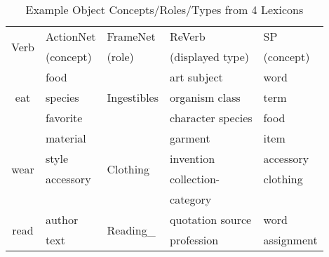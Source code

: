 \begin{table}[th]
\centering
\scriptsize
\caption{Example Object Concepts/Roles/Types from 4 Lexicons}
\label{snapshot}
\begin{tabular}{|c|l|l|l|l|}
\hline
\multirow{2}{*}{Verb} & ActionNet & FrameNet   & ReVerb & SP\\
 & (concept) & (role) & (displayed type)& (concept) \\
\hline \hline
\multirow{3}{*}{eat} & food & \multirow{3}{*}{Ingestibles} & art subject & word	\\
      &  species            &       & organism class & term\\
      &  favorite           &       & character species & food\\
      \hline
\multirow{4}{*}{wear} & material & \multirow{4}{*}{Clothing} & garment &
item\\
      & style  & & invention &  accessory\\
      &  accessory &       & collection-& 	clothing\\
      &  &       & category & \\
      \hline
\multirow{3}{*}{read} & author  & \multirow{2}{*}{Reading\_} & quotation source & word\\
      &  text & \multirow{2}{*}{activity} &profession  & assignment	\\

\end{tabular}
\end{table}
